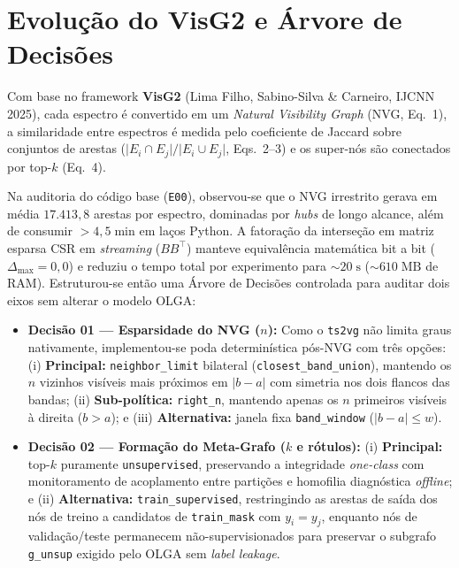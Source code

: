 \documentclass[11pt,a4paper]{article}
\begin{document}
\section{Evolução do VisG2 e Árvore de Decisões}
Com base no framework \textbf{VisG2} (Lima Filho, Sabino-Silva \& Carneiro, IJCNN 2025), cada espectro é convertido em um \textit{Natural Visibility Graph} (NVG, Eq.\ 1), a similaridade entre espectros é medida pelo coeficiente de Jaccard sobre conjuntos de arestas ($\lvert E_i \cap E_j \rvert / \lvert E_i \cup E_j \rvert$, Eqs.\ 2--3) e os super-nós são conectados por top-$k$ (Eq.\ 4).

Na auditoria do código base (\texttt{E00}), observou-se que o NVG irrestrito gerava em média $17.413{,}8$ arestas por espectro, dominadas por \textit{hubs} de longo alcance, além de consumir $>4{,}5\;\text{min}$ em laços Python. A fatoração da interseção em matriz esparsa CSR em \textit{streaming} ($B B^\top$) manteve equivalência matemática bit a bit ($\Delta_{\max}=0{,}0$) e reduziu o tempo total por experimento para $\sim 20\;\text{s}$ ($\sim 610\;\text{MB}$ de RAM). Estruturou-se então uma Árvore de Decisões controlada para auditar dois eixos sem alterar o modelo OLGA:

\begin{itemize}
    \item \textbf{Decisão 01 — Esparsidade do NVG ($n$):} Como o \texttt{ts2vg} não limita graus nativamente, implementou-se poda determinística pós-NVG com três opções: (i) \textbf{Principal:} \texttt{neighbor\_limit} bilateral (\texttt{closest\_band\_union}), mantendo os $n$ vizinhos visíveis mais próximos em $\lvert b-a \rvert$ com simetria nos dois flancos das bandas; (ii) \textbf{Sub-política:} \texttt{right\_n}, mantendo apenas os $n$ primeiros visíveis à direita ($b>a$); e (iii) \textbf{Alternativa:} janela fixa \texttt{band\_window} ($\lvert b-a \rvert \le w$).
    \item \textbf{Decisão 02 — Formação do Meta-Grafo ($k$ e rótulos):} (i) \textbf{Principal:} top-$k$ puramente \texttt{unsupervised}, preservando a integridade \textit{one-class} com monitoramento de acoplamento entre partições e homofilia diagnóstica \textit{offline}; e (ii) \textbf{Alternativa:} \texttt{train\_supervised}, restringindo as arestas de saída dos nós de treino a candidatos de \texttt{train\_mask} com $y_i=y_j$, enquanto nós de validação/teste permanecem não-supervisionados para preservar o subgrafo \texttt{g\_unsup} exigido pelo OLGA sem \textit{label leakage}.
\end{itemize}
\end{document}
